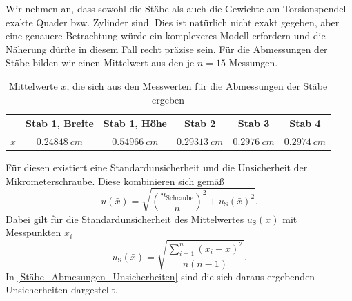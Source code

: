 \documentclass[
	a4paper,
	12pt,
	pagesize,
	ngerman
]{scrartcl}
\begin{document}
	Wir nehmen an, dass sowohl die Stäbe als auch die Gewichte am Torsionspendel exakte Quader bzw. Zylinder sind. Dies ist natürlich nicht exakt gegeben, aber eine genauere Betrachtung würde ein komplexeres Modell erfordern und die Näherung dürfte in diesem Fall recht präzise sein.
	Für die Abmessungen der Stäbe bilden wir einen Mittelwert aus den je $ n=15 $ Messungen.
	

	\begin{table}[tb]
		\centering
		\begin{tabular}{ r | c | c | c | c | c |} 
			& Stab 1, Breite & Stab 1, Höhe  & Stab 2 & Stab 3 &  Stab 4 \\ \hline
			$ \bar{x} $  & $\SI{0,24848}{cm}$ &  $\SI{0,54966}{cm}$ &  $\SI{0,29313}{cm}$ &  $\SI{0,2976}{cm}$ & $\SI{0,2974}{cm}$  \\ \hline
		\end{tabular}
		\caption{Mittelwerte $ \bar{x} $, die sich aus den Messwerten für die Abmessungen der Stäbe ergeben}
		\label{Abmessungen_Stäbe}
	\end{table}
	Für diesen existiert eine Standardunsicherheit und die Unsicherheit der Mikrometerschraube. Diese kombinieren sich gemäß
	\begin{equation*}
		u(\bar{x})=\sqrt{\left( \frac{u_\text{Schraube}}{n}\right) ^2+u_\text{S}(\bar{x})^2}.
	\end{equation*}
	Dabei gilt für die Standardunsicherheit des Mittelwertes $u_\text{S}(\bar{x} )$ mit Messpunkten $x_i$
	\begin{equation*}
		u_\text{S}(\bar{x} ) = \sqrt{\frac{\sum_{i=1}^{n} (x_i-\bar{x})^2}{n(n-1)}}.
	\end{equation*}
	In \cref{Stäbe_Abmesungen_Unsicherheiten} sind die sich daraus ergebenden Unsicherheiten dargestellt.
	
\end{document}
